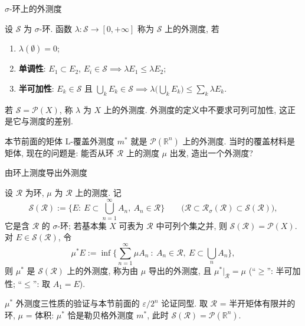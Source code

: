 \begin{frame}{$\sigma$-环上的外测度}

\begin{Def}
设 $\mathscr{S}$ 为 $\sigma$-环. 函数 $\lambda: \mathscr{S} \to [0, +\infty]$ 称为 $\mathscr{S}$ 上的\alert{外测度}, 若
\begin{enumerate}
\item $\lambda(\emptyset) = 0$;
\item \textbf{单调性}: $E_1 \subset E_2$, $E_i \in \mathscr{S} \implies \lambda E_1 \leqslant \lambda E_2$;
\item \textbf{半可加性}: $E_k \in \mathscr{S}$ 且 $\bigcup_k E_k \in \mathscr{S} \implies \lambda\big(\bigcup_k E_k\big) \leqslant \sum_k \lambda E_k$.
\end{enumerate}
若 $\mathscr{S} = \mathscr{P}(X)$, 称 $\lambda$ 为 $X$ 上的外测度. 外测度的定义中\alert{不要求}可列可加性, 这正是它与测度的差别.
\end{Def}

\pause

\begin{remark}
本节前面的矩体 L-覆盖外测度 $m^*$ 就是 $\mathscr{P}(\mathbb{R}^n)$ 上的外测度. 当时的覆盖材料是矩体, 现在的问题是: \alert{能否从环 $\mathscr{R}$ 上的测度 $\mu$ 出发, 造出一个外测度?}
\end{remark}

\end{frame}


\begin{frame}{由环上测度导出外测度}

\begin{Def}[可列覆盖类与导出外测度]
设 $\mathscr{R}$ 为环, $\mu$ 为 $\mathscr{R}$ 上的测度. 记
\[
\mathscr{S}(\mathscr{R}) := \big\{ E :\ E \subset \textstyle\bigcup_{n=1}^\infty A_n,\ A_n \in \mathscr{R} \big\}
\qquad \big(\mathscr{R} \subset \mathscr{R}_\sigma(\mathscr{R}) \subset \mathscr{S}(\mathscr{R})\big),
\]
它是含 $\mathscr{R}$ 的 $\sigma$-环; 若基本集 $X$ 可表为 $\mathscr{R}$ 中可列个集之并, 则 $\mathscr{S}(\mathscr{R}) = \mathscr{P}(X)$. 对 $E \in \mathscr{S}(\mathscr{R})$, 令
\[
\mu^* E := \inf \Big\{ \sum_{n=1}^\infty \mu A_n \ :\ A_n \in \mathscr{R},\ E \subset \bigcup_n A_n \Big\},
\]
则 $\mu^*$ 是 $\mathscr{S}(\mathscr{R})$ 上的外测度, 称为\alert{由 $\mu$ 导出的外测度}, 且 $\mu^*\big|_{\mathscr{R}} = \mu$ (``$\geqslant$'': 半可加性; ``$\leqslant$'': 取 $A_1 = E$).
\end{Def}

\pause

\begin{remark}
$\mu^*$ 外测度三性质的验证与本节前面的 $\varepsilon/2^n$ 论证同型. 取 $\mathscr{R}$ = 半开矩体有限并的环, $\mu$ = 体积: $\mu^*$ 恰是勒贝格外测度 $m^*$, 此时 $\mathscr{S}(\mathscr{R}) = \mathscr{P}(\mathbb{R}^n)$.
\end{remark}

\end{frame}

